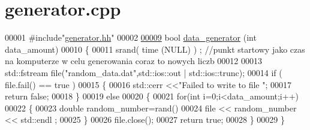 \hypertarget{generator_8cpp_source}{}\section{generator.\+cpp}
\label{generator_8cpp_source}

\begin{DoxyCode}
00001 \textcolor{preprocessor}{ #include"\hyperlink{generator_8hh}{generator.hh}"}
00002 
\hypertarget{generator_8cpp_source_l00009}{}\hyperlink{generator_8cpp_a6c501967035e575874570ef71d23f3af}{00009} \textcolor{keywordtype}{bool} \hyperlink{generator_8cpp_a6c501967035e575874570ef71d23f3af}{data\_generator} (\textcolor{keywordtype}{int} data\_amount)
00010 \{
00011   srand( time (NULL) ) ; \textcolor{comment}{//punkt startowy jako czas na komputerze w celu generowania coraz to nowych liczb}
00012  
00013   std::fstream file(\textcolor{stringliteral}{"random\_data.dat"},std::ios::out | std::ios::trunc);
00014   \textcolor{keywordflow}{if} ( file.fail() == true )
00015     \{
00016       std::cerr <<\textcolor{stringliteral}{"Failed to write to file "};
00017       \textcolor{keywordflow}{return} \textcolor{keyword}{false};
00018     \}
00019   \textcolor{keywordflow}{else}
00020     \{
00021       \textcolor{keywordflow}{for}(\textcolor{keywordtype}{int} i=0;i<data\_amount;i++)
00022     \{
00023       \textcolor{keywordtype}{double} random\_number=rand() %
00024       file << random\_number << std::endl ;
00025     \}
00026       file.close();
00027       \textcolor{keywordflow}{return} \textcolor{keyword}{true}; 
00028     \} 
00029 \}
\end{DoxyCode}
